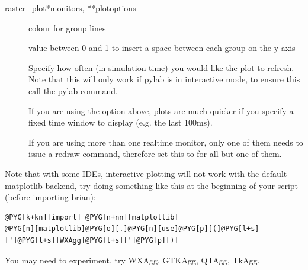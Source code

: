 \documentclass[letterpaper,10pt,english]{manual}
\begin{document}
\begin{funcdesc}{raster\_plot}{*monitors, **plotoptions}
\begin{description}
\item[] \leavevmode
colour for group lines

\item[] \leavevmode
value between 0 and 1 to insert a space between
each group on the y-axis

\item[] \leavevmode
Specify how often (in simulation time) you would like the plot to
refresh. Note that this will only work if pylab is in interactive mode,
to ensure this call the pylab  command.

\item[] \leavevmode
If you are using the  option above, plots are much quicker
if you specify a fixed time window to display (e.g. the last 100ms).

\item[] \leavevmode
If you are using more than one realtime monitor, only one of them needs
to issue a redraw command, therefore set this to  for all but
one of them.

\end{description}

Note that with some IDEs, interactive plotting will not work with the
default matplotlib backend, try doing something like this at the
beginning of your script (before importing brian):

\begin{Verbatim}[commandchars=@\[\]]
@PYG[k+kn][import] @PYG[n+nn][matplotlib]
@PYG[n][matplotlib]@PYG[o][.]@PYG[n][use]@PYG[p][(]@PYG[l+s][']@PYG[l+s][WXAgg]@PYG[l+s][']@PYG[p][)]
\end{Verbatim}

You may need to experiment, try WXAgg, GTKAgg, QTAgg, TkAgg.
\end{funcdesc}
\end{document}
